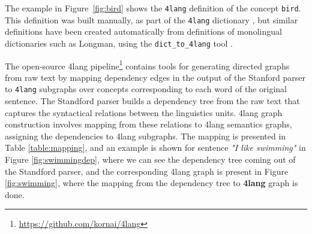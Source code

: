 The example in
Figure~\ref{fig:bird} shows the \texttt{4lang} definition of the
concept \texttt{bird}. This definition was built manually, as part of
the \texttt{4lang} dictionary \cite{Kornai:2013}, but similar
definitions have been created automatically from definitions of
monolingual dictionaries such as Longman, using the
\texttt{dict\_to\_4lang} tool \cite{Recski:2016d}.

The open-source 4lang pipeline\footnote{\url{https://github.com/kornai/4lang}}
contains tools for generating
directed graphs from raw text by mapping dependency edges in the output of the
Stanford parser \cite{deMarneffe:2006} to \texttt{4lang} subgraphs over
concepts corresponding to each word of the original sentence. The Standford parser builds a dependency tree from the raw text that captures the syntactical relations between the linguistics units. 4lang graph construction involves mapping from these relations to 4lang semantics graphs, assigning the dependencies to 4lang subgraphs. The mapping is presented in Table \ref{table:mapping}, and an example is shown for sentence \textit{"I like swimming"} in Figure \ref{fig:swimmingdep}, where we can see the dependency tree coming out of the Standford parser, and the corresponding 4lang graph is present in Figure \ref{fig:swimming}, where the mapping from the dependency tree to \textbf{4lang} graph is done. 

